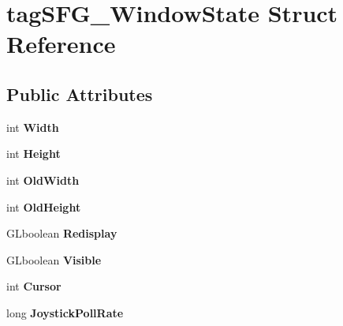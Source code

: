 \hypertarget{structtag_s_f_g___window_state}{}\section{tag\+S\+F\+G\+\_\+\+Window\+State Struct Reference}
\label{structtag_s_f_g___window_state}
\subsection*{Public Attributes}
\begin{DoxyCompactItemize}
\item 
int {\bfseries Width}\hypertarget{structtag_s_f_g___window_state_a5c93c4c8cddfe095eea8fd8f02b2b667}{}\label{structtag_s_f_g___window_state_a5c93c4c8cddfe095eea8fd8f02b2b667}

\item 
int {\bfseries Height}\hypertarget{structtag_s_f_g___window_state_a5006040469f77f91509969510f920d9c}{}\label{structtag_s_f_g___window_state_a5006040469f77f91509969510f920d9c}

\item 
int {\bfseries Old\+Width}\hypertarget{structtag_s_f_g___window_state_aacc757a2a1643d2218754f4fb5a6de42}{}\label{structtag_s_f_g___window_state_aacc757a2a1643d2218754f4fb5a6de42}

\item 
int {\bfseries Old\+Height}\hypertarget{structtag_s_f_g___window_state_aab4cc99d0789a61567579725ef8cc7b6}{}\label{structtag_s_f_g___window_state_aab4cc99d0789a61567579725ef8cc7b6}

\item 
G\+Lboolean {\bfseries Redisplay}\hypertarget{structtag_s_f_g___window_state_a8c299bc2c70825b1389b560877246f07}{}\label{structtag_s_f_g___window_state_a8c299bc2c70825b1389b560877246f07}

\item 
G\+Lboolean {\bfseries Visible}\hypertarget{structtag_s_f_g___window_state_aaabb9cb0f5d8ef0972c222b4bc5f4e1c}{}\label{structtag_s_f_g___window_state_aaabb9cb0f5d8ef0972c222b4bc5f4e1c}

\item 
int {\bfseries Cursor}\hypertarget{structtag_s_f_g___window_state_abdb8344dec997a246512128c9d334b90}{}\label{structtag_s_f_g___window_state_abdb8344dec997a246512128c9d334b90}

\item 
long {\bfseries Joystick\+Poll\+Rate}\hypertarget{structtag_s_f_g___window_state_a77db81848982950fa6040212771c8b16}{}\label{structtag_s_f_g___window_state_a77db81848982950fa6040212771c8b16}


\end{DoxyCompactItemize}
